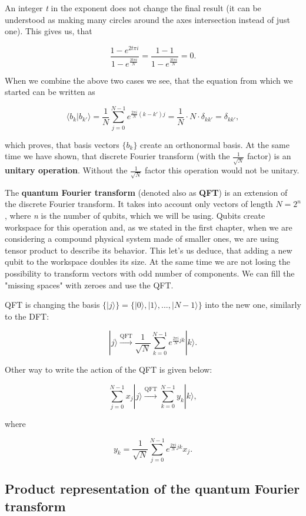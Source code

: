 \begin{remark}
\newpage
An integer \textit{t} in the exponent does not change the final result (it can be understood as making many circles around the axes intersection instead of just one). This gives us, that

\[\frac{1 - e^{2t \pi i}}{1 - e^{\frac{2t \pi i}{N}}} = \frac{1 - 1}{1 - e^{\frac{2t \pi i}{N}}} = 0.\]

When we combine the above two cases we see, that the equation from which we started can be written as

\[ \langle b_k | b_{k'} \rangle = \frac{1}{N} \sum_{j = 0}^{N - 1} e^{\frac{2 \pi i}{N} (k - k')j} = \frac{1}{N} \cdot N \cdot \delta_{kk'} = \delta_{kk'}, \]

which proves, that basis vectors $\{b_k\}$ create an orthonormal basis. At the same time we have shown, that discrete Fourier transform (with the $\frac{1}{\sqrt{N}}$ factor) is an \textbf{unitary operation}. Without the $\frac{1}{\sqrt{N}}$ factor this operation would not be unitary.
\end{remark}

The \textbf{quantum Fourier transform} (denoted also as \textbf{QFT}) is an extension of the discrete Fourier transform. It takes into account only vectors of length $N = 2^n$, where \textit{n} is the number of qubits, which we will be using. Qubits create workspace for this operation and, as we stated in the first chapter, when we are considering a compound physical system made of smaller ones, we are using tensor product to describe its behavior. This let's us deduce, that adding a new qubit to the workspace doubles its size. At the same time we are not losing the possibility to transform vectors with odd number of components. We can fill the "missing spaces" with zeroes and use the QFT.

QFT is changing the basis $\{|j\rangle \} = \{ |0\rangle, |1\rangle, ..., |N - 1\rangle \}$ into the new one, similarly to the DFT:

\[ |j\rangle \xrightarrow{\text{QFT}} \frac{1}{\sqrt{N}} \sum_{k = 0}^{N - 1} e^{\frac{2 \pi i}{N} jk} |k\rangle.\]

Other way to write the action of the QFT is given below:

\[ \sum_{j = 0}^{N - 1}x_j |j\rangle \xrightarrow{\text{QFT}} \sum_{k = 0}^{N - 1} y_k |k\rangle,\]

where

\[ y_k = \frac{1}{\sqrt{N}} \sum_{j = 0}^{N - 1} e^{\frac{2 \pi i}{N}jk} x_j.\]

\subsection{Product representation of the quantum Fourier transform}

